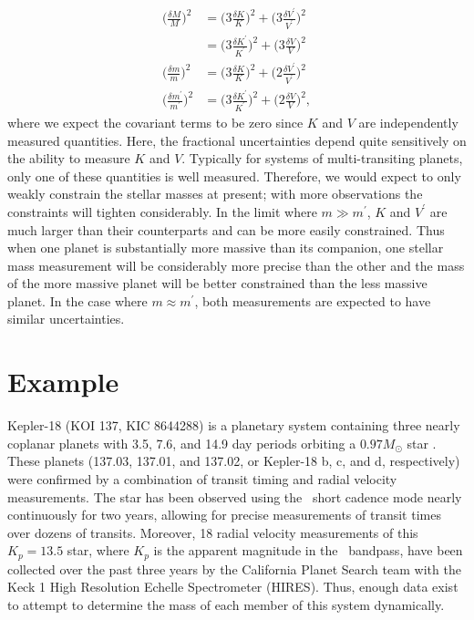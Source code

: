 \begin{align}
\bigg(\frac{\delta M}{M}\bigg)^2 &=  \bigg(3 \frac{ \delta K }{K}\bigg) ^2 +  \bigg(3 \frac{ \delta V^\prime}{V^\prime} \bigg) ^2 \nonumber \\
 &=  \bigg(3\frac{ \delta K^\prime }{K^\prime}\bigg) ^2 +  \bigg(3 \frac{\delta V}{V} \bigg) ^2 \\
\bigg(\frac{\delta m}{m}\bigg)^2 &=  \bigg(3\frac{ \delta K }{K}\bigg) ^2 +  \bigg(2 \frac{\delta V^\prime}{V^\prime} \bigg) ^2 \\
\bigg(\frac{\delta m^\prime}{m^\prime}\bigg)^2 &=  \bigg(3\frac{ \delta K^\prime }{K^\prime}\bigg) ^2 +  \bigg(2 \frac{\delta V}{V} \bigg) ^2,
\end{align}
where we expect the covariant terms to be zero since $K$ and $V$ are independently measured quantities. Here, the fractional uncertainties depend quite sensitively on the ability to measure $K$ and $V$. Typically for systems of multi-transiting planets, only one of these quantities is well measured. Therefore, we would expect to only weakly constrain the stellar masses at present; with more observations the constraints will tighten considerably. In the limit where $m \gg m^\prime$, $K$ and $V^{\prime}$ are much larger than their counterparts and can be more easily constrained. Thus when one planet is substantially more massive than its companion, one stellar mass measurement will be considerably more precise than the other and the mass of the more massive planet will be better constrained than the less massive planet. In the case where $m \approx m^\prime$, both measurements are expected to have similar uncertainties. 

\section{Example}

Kepler-18 (KOI 137, KIC 8644288) is a planetary system containing three nearly coplanar planets with 3.5, 7.6, and 14.9 day periods orbiting a $0.97 M_\odot$ star \citep[henceforth C11]{Cochran11}. These planets (137.03, 137.01, and 137.02, or Kepler-18 b, c, and d, respectively) were confirmed by a combination of transit timing and radial velocity measurements. The star has been observed using the \kep\ short cadence mode nearly continuously for two years, allowing for precise measurements of transit times over dozens of transits. Moreover, 18 radial velocity measurements of this $K_p = 13.5$ star, where $K_p$ is the apparent magnitude in the \kep\ bandpass, have been collected over the past three years by the California Planet Search team with the Keck 1 High Resolution Echelle Spectrometer (HIRES). Thus, enough data exist to attempt to determine the mass of each member of this system dynamically.


